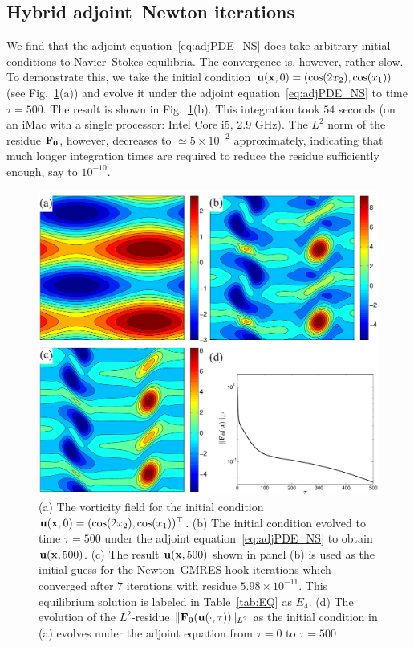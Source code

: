 \documentclass{jfm}
\begin{document}
\subsection{Hybrid adjoint--Newton iterations}\label{sec:hybrid}
We find that the adjoint equation~\eqref{eq:adjPDE_NS} does take arbitrary initial conditions to
Navier--Stokes equilibria. The convergence is, however, rather slow. To demonstrate this, we
take the initial condition $\mathbf u(\mathbf x,0)=(\cos(2x_2),\cos(x_1))$ (see Fig.~\ref{fig:hybrid}(a))
and
evolve it under the adjoint equation~\eqref{eq:adjPDE_NS} to time $\tau=500$. The result is
shown in Fig.~\ref{fig:hybrid}(b). This integration took $54$ seconds
(on an iMac with a single processor: Intel Core i5, 2.9 GHz).
The $L^2$ norm of the residue $\mathbf F_{\mathbf 0}$, however,
decreases to $\simeq 5\times 10^{-2}$ approximately, indicating that much longer integration times
are required to reduce the residue sufficiently enough, say to $10^{-10}$.
%
\begin{figure}
\centering
\includegraphics[width=.85\textwidth]{hybrid}
\caption{
(a) The vorticity field for the initial condition $\mathbf
u(\mathbf x,0)=(\cos(2x_2),\cos(x_1))^\top$.
(b) The initial
condition evolved to time $\tau=500$ under the adjoint equation~\eqref{eq:adjPDE_NS} to obtain
$\mathbf u(\mathbf x,500)$.
(c) The result $\mathbf u(\mathbf x,500)$ shown in panel (b) is used as the initial
guess for the
Newton--GMRES-hook iterations which converged after $7$ iterations with residue
$5.98\times 10^{-11}$. This equilibrium solution is labeled in Table~\ref{tab:EQ} as $E_4$.
(d) The evolution of the $L^2$-residue $\|\mathbf F_{\mathbf 0}(\mathbf u(\cdot,\tau))\|_{L^2}$
as the initial condition in (a) evolves under the adjoint equation from
$\tau=0$ to $\tau=500$}
\label{fig:hybrid}
\end{figure}
\end{document}

